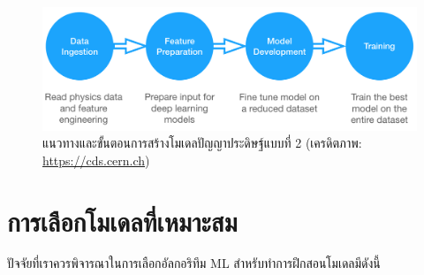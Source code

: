 \begin{figure}[htbp]
    \centering
    \includegraphics[width=\linewidth]{fig/ml_pipeline.png}
    \caption{แนวทางและขั้นตอนการสร้างโมเดลปัญญาประดิษฐ์แบบที่ 2 (เครดิตภาพ: \url{https://cds.cern.ch})}
    \label{fig:ml_pipeline}
\end{figure}

\section{การเลือกโมเดลที่เหมาะสม}
\label{sec:choose_ml_model}

ปัจจัยที่เราควรพิจารณาในการเลือกอัลกอริทึม ML สำหรับทำการฝึกสอนโมเดลมีดังนี้

